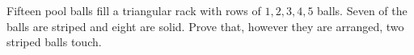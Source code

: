 Fifteen pool balls fill a triangular rack with rows of $1,2,3,4,5$ balls. Seven of the balls are striped and eight are solid. Prove that, however they are arranged, two striped balls touch.
